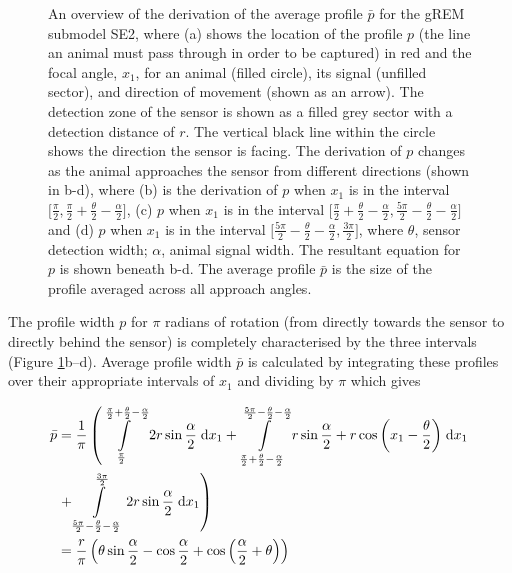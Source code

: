 \begin{figure}[t]
\caption[An overview of the derivation of the average profile $\bar{p}$ for the gREM submodel SE2]{
An overview of the derivation of the average profile $\bar{p}$ for the gREM submodel SE2, where (a) shows the location of the profile $p$ (the line an animal must pass through in order to be captured) in red and the focal angle, $x_1$, for an animal (filled circle), its signal (unfilled sector), and direction of movement (shown as an arrow).
The detection zone of the sensor is shown as a filled grey sector with a detection distance of $r$.
The vertical black line within the circle shows the direction the sensor is facing.
The derivation of $p$ changes as the animal approaches the sensor from different directions (shown in b-d), where (b) is the derivation of $p$ when $x_1$ is in the interval $\lbrack\frac{\pi}{2}, \frac{\pi}{2} + \frac{\theta}{2} - \frac{\alpha}{2}\rbrack$, (c)  $p$ when $x_1$ is in the interval $\lbrack\frac{\pi}{2} + \frac{\theta}{2} - \frac{\alpha}{2}, \frac{5 \pi}{2} - \frac{\theta}{2} - \frac{\alpha}{2} \rbrack$ and (d) $p$ when $x_1$ is in the interval $\lbrack\frac{5 \pi}{2} - \frac{\theta}{2} - \frac{\alpha}{2}, \frac{3 \pi}{2}\rbrack$, where $\theta$, sensor detection width; $\alpha$, animal signal width.
The resultant equation for $p$ is shown beneath b-d.
The average profile $\bar{p}$ is the size of the profile averaged across all approach angles.}
\label{f:x1AndInt}

\end{figure}

The profile width $p$ for $\pi$ radians of rotation (from directly towards the sensor to directly behind the sensor) is completely characterised by the three intervals (Figure \ref{f:x1AndInt}b--d).
Average profile width $\bar{p}$ is calculated by integrating these profiles over their appropriate intervals of $x_1$ and dividing by $\pi$ which gives

\begin{align}
    \bar{p} &=\frac{1}{\pi} \left(\int\limits_{\frac{\pi}{2}}^{\frac{\pi}{2} + \frac{\theta}{2} - \frac{\alpha}{2}}2 r \sin{\frac{\alpha}{2} }\;\mathrm{d}x_1+\int\limits_{\frac{\pi}{2} + \frac{\theta}{2} - \frac{\alpha}{2}}^{\frac{5 \pi}{2} - \frac{\theta}{2} - \frac{\alpha}{2}}r \sin{\frac{\alpha}{2} } + r \cos{\left (x_1 - \frac{\theta}{2} \right )}\;\mathrm{d}x_1\right.\notag\\
 &\left.+\int\limits_{\frac{5 \pi}{2} - \frac{\theta}{2} - \frac{\alpha}{2}}^{\frac{3 \pi}{2}}2 r \sin{\frac{\alpha}{2} }\;\mathrm{d}x_1\right) \label{e:SE2int}  \\
     &= \frac{r}{\pi} \left(\theta \sin{\frac{\alpha}{2} } - \cos{\frac{\alpha}{2} } + \cos{\left (\frac{\alpha}{2} + \theta \right )}\right) \label{e:SE2result}
\end{align}

